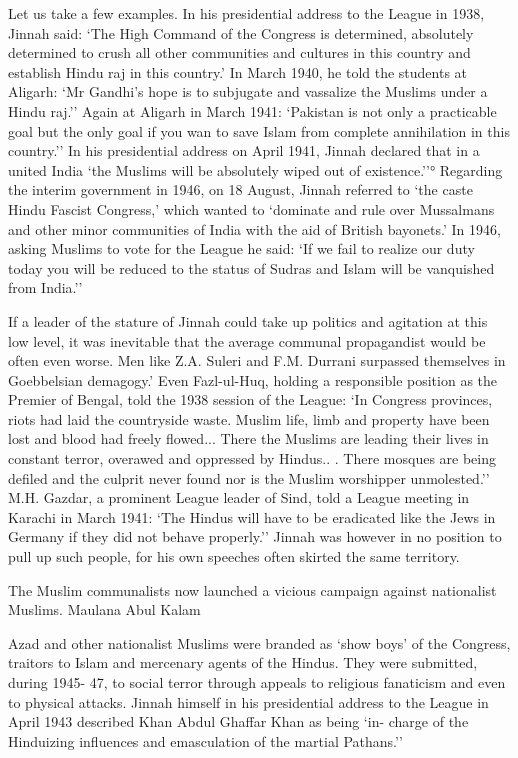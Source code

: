 Let us take a few examples. In his presidential address to the League in 1938, Jinnah said: `The High Command of the Congress is determined, absolutely determined to crush all other communities and cultures in this country and establish Hindu raj in this country.' In March 1940, he told the students at Aligarh: `Mr Gandhi's hope is to subjugate and vassalize the Muslims under a Hindu raj.'' Again at Aligarh in March 1941: `Pakistan is not only a practicable goal but the only goal if you wan to save Islam from complete annihilation in this country.'' In his presidential address on April 1941, Jinnah declared that in a united India `the Muslims will be absolutely wiped out of existence.''° Regarding the interim government in 1946, on 18 August, Jinnah referred to `the caste Hindu Fascist Congress,' which wanted to `dominate and rule over Mussalmans and other minor communities of India with the aid of British bayonets.' In 1946, asking Muslims to vote for the League he said: `If we fail to realize our duty today you will be reduced to the status of Sudras and Islam will be vanquished from India.'' 

If a leader of the stature of Jinnah could take up politics and agitation at this low level, it was inevitable that the average communal propagandist would be often even worse. Men like Z.A. Suleri and F.M. Durrani surpassed themselves in Goebbelsian demagogy.' Even Fazl-ul-Huq, holding a responsible position as the Premier of Bengal, told the 1938 session of the League: `In Congress provinces, riots had laid the countryside waste. Muslim life, limb and property have been lost and blood had freely flowed... There the Muslims are leading their lives in constant terror, overawed and oppressed by Hindus.. . There mosques are being defiled and the culprit never found nor is the Muslim worshipper unmolested.'' M.H. Gazdar, a prominent League leader of Sind, told a League meeting in Karachi in March 1941: `The Hindus will have to be eradicated like the Jews in Germany if they did not behave properly.'' Jinnah was however in no position to pull up such people, for his own speeches often skirted the same territory. 

The Muslim communalists now launched a vicious campaign against nationalist Muslims. Maulana Abul Kalam 

Azad and other nationalist Muslims were branded as `show boys' of the Congress, traitors to Islam and mercenary agents of the Hindus. They were submitted, during 1945- 47, to social terror through appeals to religious fanaticism and even to physical attacks. Jinnah himself in his presidential address to the League in April 1943 described Khan Abdul Ghaffar Khan as being `in- charge of the Hinduizing influences and emasculation of the martial Pathans.'' 

